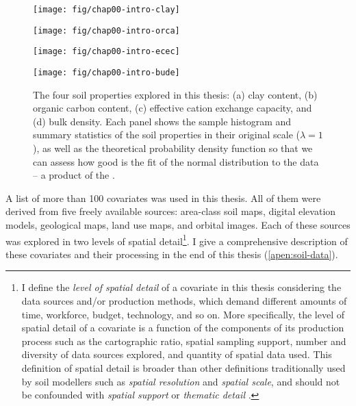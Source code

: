 \begin{figure}[!ht]
\centering
\begin{minipage}[b]{63mm}
\subcaption{}
\centering
\texttt{[image: fig/chap00-intro-clay]}
\end{minipage}
\begin{minipage}[b]{63mm}
\subcaption{}
\centering
\texttt{[image: fig/chap00-intro-orca]}
\end{minipage}
\begin{minipage}[b]{63mm}
\subcaption{}
\centering
\texttt{[image: fig/chap00-intro-ecec]}
\end{minipage}
\begin{minipage}[b]{63mm}
\subcaption{}
\centering
\texttt{[image: fig/chap00-intro-bude]}
\end{minipage}
\caption{The four soil properties explored in this thesis: (a) clay content, (b) organic carbon
content, (c) effective cation exchange capacity, and (d) bulk density. Each panel shows the sample
histogram and summary statistics of the soil properties in their original scale ($\lambda = 1$), as
well as the theoretical probability density function so that we can assess how good is the fit of
the normal distribution to the data -- a product of the .}
\label{fig:intro-soil-properties}
\end{figure}

A list of more than \num{100} covariates was used in this thesis. All of them were derived from five freely 
available sources: area-class soil maps, digital elevation models, geological maps, land use maps, and orbital 
images. Each of these sources was explored in two levels of spatial detail\footnote{I define the \emph{level of 
spatial detail} of a covariate in this thesis considering the data sources and/or production methods, which 
demand different amounts of time, workforce, budget, technology, and so on. More specifically, the level of 
spatial detail of a covariate is a function of the components of its production process such as the 
cartographic ratio, spatial sampling support, number and diversity of data sources explored, and quantity of 
spatial data used. This definition of spatial detail is broader than other definitions traditionally used by 
soil modellers such as \emph{spatial resolution} and \emph{spatial scale}, and should not be confounded with 
\emph{spatial support} \cite{WebsterEtAl2007} or \emph{thematic detail} \cite{Rossiter2000}.}. I give a 
comprehensive description of these covariates and their processing in the end of this thesis 
(\autoref{apen:soil-data}).

